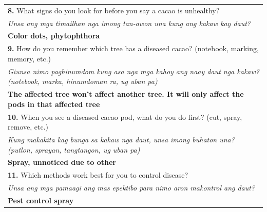 {\begin{longtable}{|p{4cm}|p{10cm}|}
		\multicolumn{2}{|p{12cm}|}{\vspace{0.1cm} \textbf{8.} What signs do you look for before you say a cacao is unhealthy?}                                                                 \\
		\multicolumn{2}{|p{12cm}|}{\textit{Unsa ang mga timailhan nga imong tan-awon una kung ang kakaw kay daut?}}                                                                            \\
		\multicolumn{2}{|p{12cm}|}{\textbf{Color dots, phytophthora}}                                                                                                                          \\

		\multicolumn{2}{|p{12cm}|}{\vspace{0.1cm} \textbf{9.} How do you remember which tree has a diseased cacao? (notebook, marking, memory, etc.)}                                          \\
		\multicolumn{2}{|p{12cm}|}{\textit{Giunsa nimo paghinumdom kung asa nga mga kahoy ang naay daut nga kakaw? (notebook, marka, hinumdoman ra, ug uban pa)}}                              \\
		\multicolumn{2}{|p{12cm}|}{\textbf{The affected tree won’t affect another tree. It will only affect the pods in that affected tree}}                                                   \\

		\multicolumn{2}{|p{12cm}|}{\vspace{0.1cm} \textbf{10.} When you see a diseased cacao pod, what do you do first? (cut, spray, remove, etc.)}                                            \\
		\multicolumn{2}{|p{12cm}|}{\textit{Kung makakita kag bunga sa kakaw nga daut, unsa imong buhaton una? (putlon, sprayan, tangtangon, ug uban pa)}}                                      \\
		\multicolumn{2}{|p{12cm}|}{\textbf{Spray, unnoticed due to other}}                                                                                                                     \\

		\multicolumn{2}{|p{12cm}|}{\vspace{0.1cm} \textbf{11.} Which methods work best for you to control disease?}                                                                            \\
		\multicolumn{2}{|p{12cm}|}{\textit{Unsa ang mga pamaagi ang mas epektibo para nimo aron makontrol ang daut?}}                                                                          \\
		\multicolumn{2}{|p{12cm}|}{\textbf{Pest control spray}}                                                                                                                                \\


\end{longtable}}
